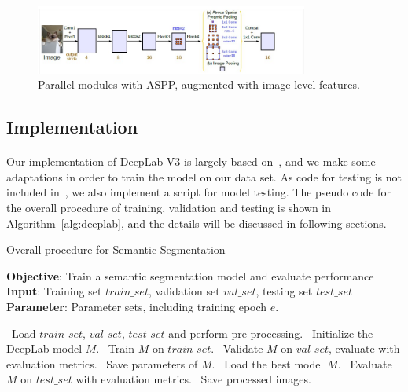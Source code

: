 \begin{figure}
    \centering
    \includegraphics[width=0.8\textwidth]{Section3/aspp.jpg}
    \caption{Parallel modules with ASPP, augmented with image-level features.}
    \label{fig:aspp}
\end{figure}

\subsection{Implementation}
\paragraph{}
Our implementation of DeepLab V3 is largely based on~\cite{Deeplab}, and we make some adaptations in order to train the model on our data set. As code for testing is not included in~\cite{Deeplab}, we also implement a script for model testing. The pseudo code for the overall procedure of training, validation and testing is shown in Algorithm~\ref{alg:deeplab}, and the details will be discussed in following sections.
\begin{algorithm}[!ht]
    \caption{Overall procedure for Semantic Segmentation}\label{alg:deeplab}
    \textbf{Objective}: Train a semantic segmentation model and evaluate performance\\
    \textbf{Input}: Training set $train\_set$, validation set $val\_set$, testing set $test\_set$\\
    \textbf{Parameter}: Parameter sets, including training epoch $e$.
    \begin{algorithmic}[1]
        \STATE~Load $train\_set$, $val\_set$, $test\_set$ and perform pre-processing.
        \STATE~Initialize the DeepLab model $M$.
            \STATE~Train $M$ on $train\_set$.
            \STATE~Validate $M$ on $val\_set$, evaluate with evaluation metrics.
                \STATE~Save parameters of $M$. 
            \ENDIF{}
        \ENDFOR{}
        \STATE~Load the best model $M$.
        \STATE~Evaluate $M$ on $test\_set$ with evaluation metrics.
        \STATE~Save processed images.
    \end{algorithmic}
\end{algorithm}
